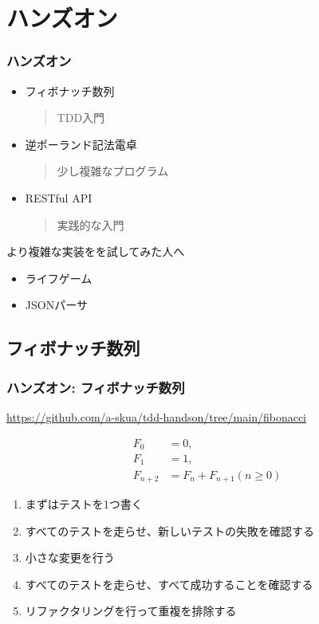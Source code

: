\documentclass[aspectratio=169]{beamer}
\begin{document}
\section{ハンズオン}
\begin{frame}\frametitle{ハンズオン}
  \begin{itemize}
    \item フィボナッチ数列
      \begin{quote}
        TDD入門
      \end{quote}
    \item 逆ポーランド記法電卓
      \begin{quote}
        少し複雑なプログラム
      \end{quote}
    \item RESTful API
      \begin{quote}
        実践的な入門
      \end{quote}
  \end{itemize}

  \color{gray}
  より複雑な実装をを試してみた人へ
  \begin{itemize}
      \color{gray}
    \item ライフゲーム
    \item JSONパーサ
  \end{itemize}
\end{frame}

\subsection{フィボナッチ数列}
\begin{frame}\frametitle{ハンズオン: フィボナッチ数列}
  {\color{gray} \url{https://github.com/a-skua/tdd-handson/tree/main/fibonacci}}

  \begin{align*}
    F_0 &= 0, \\
    F_1 &= 1, \\
    F_{n+2} &= F_n + F_{n+1} (n \ge 0)
  \end{align*}

  \begin{enumerate}
    \item まずはテストを1つ書く
    \item すべてのテストを走らせ、新しいテストの失敗を確認する
    \item 小さな変更を行う
    \item すべてのテストを走らせ、すべて成功することを確認する
    \item リファクタリングを行って重複を排除する
  \end{enumerate}
\end{frame}
\end{document}
